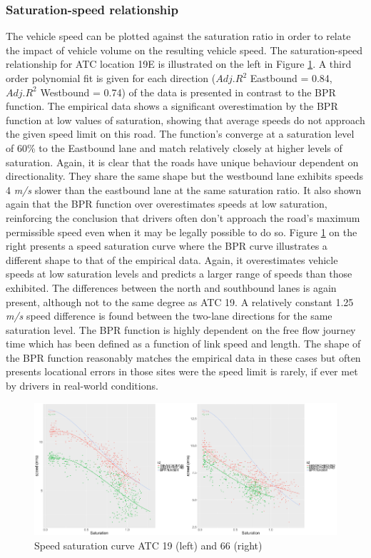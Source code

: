 \documentclass{CUP-JNL-DCE}
\begin{document}
\subsubsection{Saturation-speed relationship}

The vehicle speed can be plotted against the saturation ratio in order to relate the impact of vehicle volume on the resulting vehicle speed. The saturation-speed relationship for ATC location 19E is illustrated on the left in Figure \ref{fig:Picture3.27}. A third order polynomial fit is given for each direction ($Adj. R^2$ Eastbound = 0.84, $Adj. R^2$ Westbound = 0.74) of the data is presented in contrast to the BPR function. The empirical data shows a significant overestimation by the BPR function at low values of saturation, showing that average speeds do not approach the given speed limit on this road. The function's converge at a saturation level of 60\% to the Eastbound lane and match relatively closely at higher levels of saturation. Again, it is clear that the roads have unique behaviour dependent on directionality. They share the same shape but the westbound lane exhibits speeds 4 \textit{m/s} slower than the eastbound lane at the same saturation ratio. It also shown again that the BPR function over overestimates speeds at low saturation, reinforcing the conclusion that drivers often don't approach the road's maximum permissible speed even when it may be legally possible to do so. Figure \ref{fig:Picture3.27} on the right presents a speed saturation curve where the BPR curve illustrates a different shape to that of the empirical data. Again, it overestimates vehicle speeds at low saturation levels and predicts a larger range of speeds than those exhibited. The differences between the north and southbound lanes is again present, although not to the same degree as ATC 19. A relatively constant 1.25 \textit{m/s} speed difference is found between the two-lane directions for the same saturation level.  The BPR function is highly dependent on the free flow journey time which has been defined as a function of link speed and length. The shape of the BPR function reasonably matches the empirical data in these cases but often presents locational errors in those sites were the speed limit is rarely, if ever met by drivers in real-world conditions.

\begin{figure}[htbp!] 
	\centering    
	\includegraphics[width=1.0\textwidth]{Picture27}
	\caption[Speed saturation curve ATC 19 (left) and 66 (right)]{Speed saturation curve ATC 19 (left) and 66 (right)}
	\label{fig:Picture3.27}
\end{figure}
\end{document}
